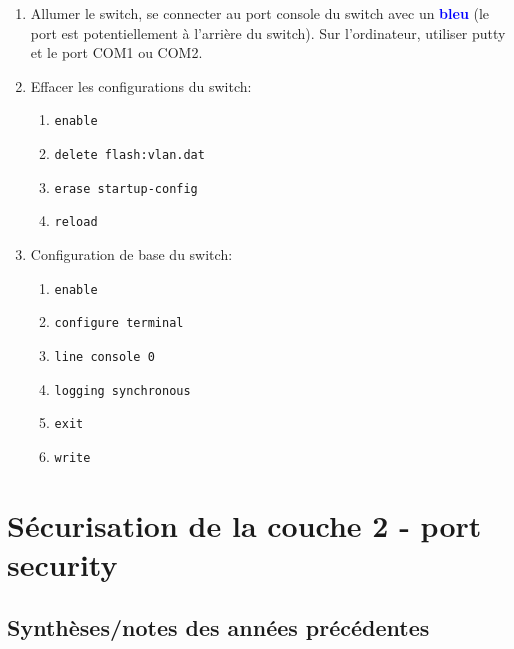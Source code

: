 \documentclass[a4paper]{article}
\begin{document}
\begin{enumerate}
\item Allumer le switch, se connecter au port console du switch avec un \textcolor{blue}{\textbf{bleu}} (le port est potentiellement à l'arrière du switch). Sur l'ordinateur, utiliser putty et le port COM1 ou COM2.

\item Effacer les configurations du switch:
\begin{enumerate}
    \item \texttt{enable}
    \item \texttt{delete flash:vlan.dat}
    \item \texttt{erase startup-config}
    \item \texttt{reload}
\end{enumerate}

\item Configuration de base du switch:
\begin{enumerate}
    \item \texttt{enable}
    \item \texttt{configure terminal}
    \item \texttt{line console 0}
    \item \texttt{logging synchronous}
    \item \texttt{exit}
    \item \texttt{write}
\end{enumerate}

\end{enumerate}















\section{Sécurisation de la couche 2 - port security}










\subsection{Synthèses/notes des années précédentes}
\end{document}
